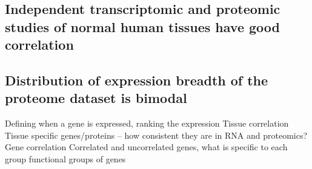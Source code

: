\subsection{Independent transcriptomic and proteomic studies of normal
human tissues have good correlation}\raggedbottom
\label{subsec:IntegrationGoodCorrProtTrans}


\subsection{Distribution of expression breadth of the proteome dataset is bimodal}\raggedbottom
\label{subsec:IntegrationProteinBimodalExpre}


Defining when a gene is expressed, ranking the expression
Tissue correlation
Tissue specific genes/proteins – how consistent they are in RNA and proteomics?
Gene correlation
Correlated and uncorrelated genes, what is specific to each group
functional groups of genes



